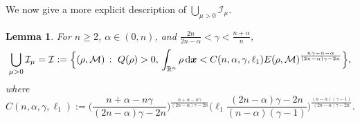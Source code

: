\documentclass[reqno,11pt]{amsart}
\numberwithin{equation}{section}
\newtheorem{lemma}[theorem]{Lemma}
\theoremstyle{definition}
\def\dd{{\, \rm d}}
\begin{document}
We now give a more explicit description of $\bigcup_{\mu > 0} \mathcal{I}_\mu$.

\begin{lemma}\label{union}
For $n \geq 2$, $\alpha \in (0,n)$, and $\frac{2n}{2n - \alpha} < \gamma < \frac{n + \alpha}{n}$, 
 \[
\begin{split}
\bigcup_{\mu > 0} \mathcal{I}_\mu  
= \mathcal{I} := \Big\{ (\rho,\mathcal{M}) \, : \,\, Q(\rho) > 0, \,
\int_{\mathbb{R}^n} \rho \dd \boldsymbol{x} < C(n,\alpha,\gamma,\ell_1)                     
   E(\rho,\mathcal{M})^\frac{n\gamma - n - \alpha}{(2n - \alpha)\gamma - 2n} \Big\},
\end{split}
\]
where 
$$
C(n,\alpha,\gamma,\ell_1):=
\Big ( \frac{n + \alpha - n\gamma}{(2n-\alpha)\gamma - 2n} \Big )^\frac{n + \alpha - n\gamma}{(2n-\alpha)\gamma - 2n}
\Big ( \ell_1 \frac{(2n-\alpha)\gamma - 2n}{(n - \alpha)(\gamma - 1)} \Big )^\frac{(n - \alpha)(\gamma - 1)}{(2n-\alpha)\gamma - 2n}. 
$$    
\end{lemma}
\end{document}
